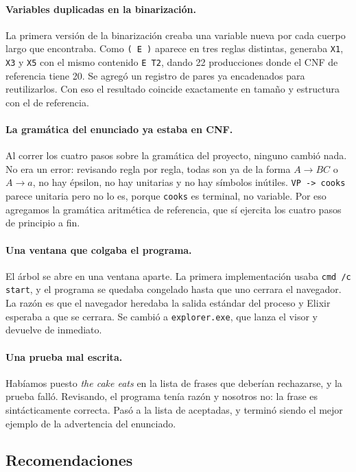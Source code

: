 \documentclass[11pt,a4paper]{article}
\newcommand{\gram}[1]{\texttt{#1}}
\begin{document}
\paragraph{Variables duplicadas en la binarización.}
La primera versión de la binarización creaba una variable nueva por cada
cuerpo largo que encontraba. Como \gram{( E )} aparece en tres reglas
distintas, generaba \gram{X1}, \gram{X3} y \gram{X5} con el mismo contenido
\gram{E T2}, dando 22 producciones donde el CNF de referencia tiene 20. Se
agregó un registro de pares ya encadenados para reutilizarlos. Con eso el
resultado coincide exactamente en tamaño y estructura con el de referencia.

\paragraph{La gramática del enunciado ya estaba en CNF.}
Al correr los cuatro pasos sobre la gramática del proyecto, ninguno cambió
nada. No era un error: revisando regla por regla, todas son ya de la forma
$A \to BC$ o $A \to a$, no hay épsilon, no hay unitarias y no hay símbolos
inútiles. \gram{VP -> cooks} parece unitaria pero no lo es, porque
\gram{cooks} es terminal, no variable. Por eso agregamos la gramática
aritmética de referencia, que sí ejercita los cuatro pasos de principio a fin.

\paragraph{Una ventana que colgaba el programa.}
El árbol se abre en una ventana aparte. La primera implementación usaba
\texttt{cmd /c start}, y el programa se quedaba congelado hasta que uno
cerrara el navegador. La razón es que el navegador heredaba la salida estándar
del proceso y Elixir esperaba a que se cerrara. Se cambió a
\texttt{explorer.exe}, que lanza el visor y devuelve de inmediato.

\paragraph{Una prueba mal escrita.}
Habíamos puesto \textit{the cake eats} en la lista de frases que deberían
rechazarse, y la prueba falló. Revisando, el programa tenía razón y nosotros
no: la frase es sintácticamente correcta. Pasó a la lista de aceptadas, y
terminó siendo el mejor ejemplo de la advertencia del enunciado.

\subsection{Recomendaciones}
\end{document}
